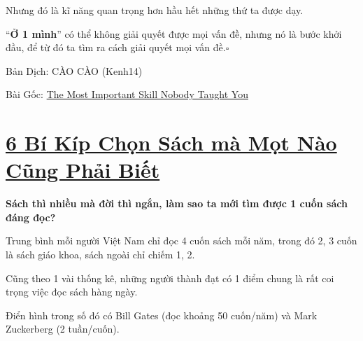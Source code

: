 \documentclass{book}
\numberwithin{equation}{section}
\begin{document}
Nhưng đó là kĩ năng quan trọng hơn hầu hết những thứ ta được dạy.

%
``\textbf{Ở 1 mình}'' có thể không giải quyết được mọi vấn đề, nhưng nó là bước khởi đầu, để từ đó ta tìm ra cách giải quyết mọi vấn đề.\hfill$\square$

\begin{flushright}
    Bản Dịch: CÀO CÀO (Kenh14)
    
    Bài Gốc: \href{https://medium.com/personal-growth/the-most-important-skill-nobody-taught-you-9b162377ab77}{The Most Important Skill Nobody Taught You}
\end{flushright}


\chapter{\href{http://tramdoc.vn/tin-tuc/sau-bi-kip-chon-sach-ma-mot-nao-cung-phai-biet-nVoMW.html}{6 Bí Kíp Chọn Sách mà Mọt Nào Cũng Phải Biết}}

\textbf{ Sách thì nhiều mà đời thì ngắn, làm sao ta mới tìm được 1 cuốn sách đáng đọc?}

%
Trung bình mỗi người Việt Nam chỉ đọc 4 cuốn sách mỗi năm, trong đó 2, 3 cuốn là sách giáo khoa, sách ngoài chỉ chiếm 1, 2.

%
Cũng theo 1 vài thống kê, những người thành đạt có 1 điểm chung là rất coi trọng việc đọc sách hàng ngày.

Điển hình trong số đó có Bill Gates (đọc khoảng 50 cuốn/năm) và Mark Zuckerberg (2 tuần/cuốn).
\end{document}
